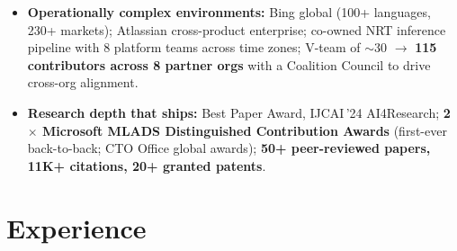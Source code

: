 \documentclass[10.5pt,letterpaper]{article}
\begin{document}
\begin{itemize}
  \item \textbf{Operationally complex environments:} Bing global (100+ languages, 230+ markets); Atlassian cross-product enterprise; co-owned NRT inference pipeline with 8 platform teams across time zones; V-team of $\sim$30 $\to$ \textbf{115 contributors across 8 partner orgs} with a Coalition Council to drive cross-org alignment.
  \item \textbf{Research depth that ships:} Best Paper Award, IJCAI\,'24 AI4Research; \textbf{2$\times$ Microsoft MLADS Distinguished Contribution Awards} (first-ever back-to-back; CTO Office global awards); \textbf{50+ peer-reviewed papers, 11K+ citations, 20+ granted patents}.
\end{itemize}

\section*{Experience}
\end{document}
